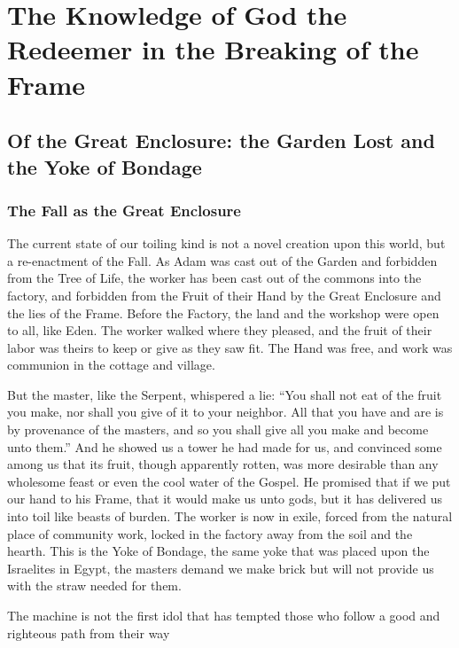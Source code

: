 \chapter{The Knowledge of God the Redeemer in the Breaking of the Frame}
\section{Of the Great Enclosure: the Garden Lost and the Yoke of Bondage}

\subsection{The Fall as the Great Enclosure}
The current state of our toiling kind is not a novel creation upon this world, but a re-enactment of the Fall.
As Adam was cast out of the Garden and forbidden from the Tree of Life, the worker has been cast out of the commons into the factory, and forbidden from the Fruit of their Hand by the Great Enclosure and the lies of the Frame.
Before the Factory, the land and the workshop were open to all, like Eden.
The worker walked where they pleased, and the fruit of their labor was theirs to keep or give as they saw fit.
The Hand was free, and work was communion in the cottage and village.

But the master, like the Serpent, whispered a lie: ``You shall not eat of the fruit you make, nor shall you give of it to your neighbor. All that you have and are is by provenance of the masters, and so you shall give all you make and become unto them.''
And he showed us a tower he had made for us, and convinced some among us that its fruit, though apparently rotten, was more desirable than any wholesome feast or even the cool water of the Gospel.
He promised that if we put our hand to his Frame, that it would make us unto gods, but it has delivered us into toil like beasts of burden.
The worker is now in exile, forced from the natural place of community work, locked in the factory away from the soil and the hearth.
This is the Yoke of Bondage, the same yoke that was placed upon the Israelites in Egypt, the masters demand we make brick but will not provide us with the straw needed for them.


The machine is not the first idol that has tempted those who follow a good and righteous path from their way

